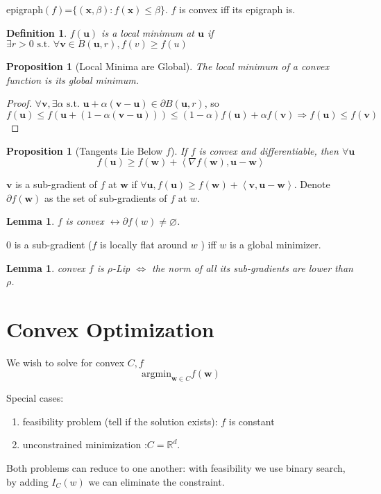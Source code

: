 \documentclass{book}
\newcommand{\R}{\mathbb{R}}
\newcommand{\st}{\text{ s.t. }}
\newcommand{\dual}[1]{\left<#1\right>}
\newtheorem{Lemma}[Thm]{Lemma}
\newtheorem{Prop}[Thm]{Proposition}
\newtheorem{Def}{Definition}[section]
\begin{document}
epigraph$(f)$=$\{(\bm{x},\beta): f(\bm x)\leq \beta\}$. $f$ is convex iff its epigraph is.
\begin{Def}
$f(\mathbf{u})$ is a local minimum at $\mathbf{u}$ if $\exists r>0\st\forall \mathbf{v}\in B(\mathbf{u},r),  f(v)\geq f(u)$
\end{Def}

\begin{Prop}[Local Minima are Global]
  The local minimum of a convex function is its global minimum.
\end{Prop}

\begin{proof}
  $\forall \mathbf{v},\exists \alpha\st \mathbf{u}+\alpha (\mathbf{v}-\mathbf{u})\in\partial B(\mathbf{u},r)$, so $f(\mathbf{u})\leq f(\mathbf{u}+(1-\alpha (\mathbf{v}-\mathbf{u})))\leq (1-\alpha)f(\mathbf{u})+\alpha f(\mathbf{v})\Rightarrow f(\mathbf{u})\leq f(\mathbf{v})$
\end{proof}

\begin{Prop}[Tangents Lie Below $f$]
  If $f$ is convex and differentiable, then $\forall \mathbf{u}$
  \[f(\mathbf{u})\geq f(\mathbf{w})+\dual{\nabla f(\mathbf{w}),\mathbf{u}-\mathbf{w}}\]
\end{Prop}

$\mathbf{v}$ is a sub-gradient of $f$ at $\mathbf{w}$ if $\forall \mathbf{u}, f(\mathbf{u})\geq f(\mathbf{w})+\dual{\mathbf{v},\mathbf{u}-\mathbf{w}}$. Denote $\partial f(\mathbf{w})$ as the set of sub-gradients of $f$ at $w$.
\begin{Lemma}
  $f$ is convex  $\leftrightarrow\partial f(w)\neq \varnothing$.
\end{Lemma}

$0$ is a sub-gradient ($f$ is locally flat around $w$ ) iff $w$ is a global minimizer.

\begin{Lemma}
  convex $f$ is $\rho$-Lip $\Leftrightarrow$ the norm of all its sub-gradients are lower than $\rho$.
\end{Lemma}


\section{Convex Optimization}
We wish to solve for convex $C,f$
\[\mathrm{argmin}_{\mathbf{w}\in C}f(\mathbf{w})\]

Special cases: 
\begin{enumerate}
\item feasibility problem (tell if the solution exists): $f$ is constant
\item unconstrained minimization :$C=\R^{d}$.
\end{enumerate}  Both problems can reduce to one another: with feasibility we use binary search, by adding $I_{C}(w)$ we can eliminate the constraint. 
\end{document}
